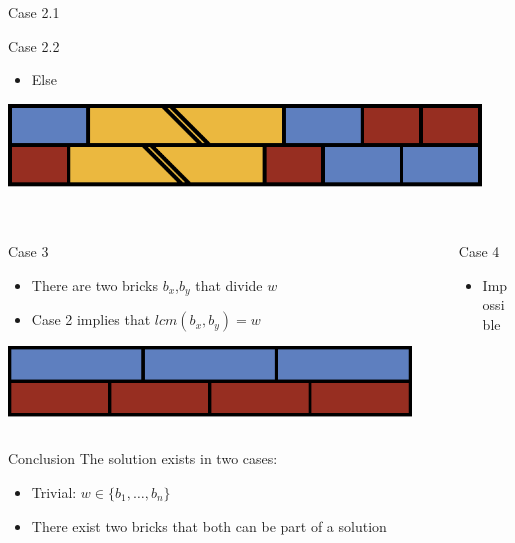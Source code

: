\begin{frame}
\begin{columns}
\begin{column}{0.4643\textwidth}
\begin{block}{Case 2.1}
			\end{block}
			\pause
			\begin{block}{Case 2.2}
				\begin{itemize}
					\item Else\strut
				\end{itemize}
				\vspace*{-0.5\baselineskip}
				\centering
				\includegraphics[width=0.94\textwidth]{case2.2}
			\end{block}
		\end{column}
	\end{columns}
\end{frame}

\begin{frame}
	\frametitle{\problemtitle}
	\begin{columns}
		\begin{column}{0.4643\textwidth}
			\begin{block}{Case 3}
				\begin{itemize}
					\item There are two bricks $b_x$,$b_y$ that divide $w$
					\pause
					\item Case 2 implies that $\mathit{lcm}(b_x,b_y)=w$
				\end{itemize}
				\vspace*{-0.5\baselineskip}
				\centering
				\includegraphics[width=0.94\textwidth]{case3}
			\end{block}	
		\end{column}
		\begin{column}{0.4643\textwidth}
			\pause
			\begin{block}{Case 4}
				\begin{itemize}
					\item Impossible
				\end{itemize}
			\end{block}
		\end{column}
	\end{columns}
	\begin{block}{Conclusion}
		The solution exists in two cases:
		\begin{itemize}
			\item Trivial: $w\in\{b_1,\dots,b_n\}$
			\item There exist two bricks that both can be part of a solution
		\end{itemize}
	\end{block}
	\pause %
	\solvestats
\end{frame}
